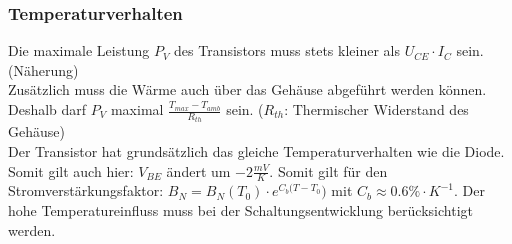 \newpage		
	\subsubsection{Temperaturverhalten}
		Die maximale Leistung $P_V$ des Transistors muss stets kleiner als 
		$U_{CE} \cdot I_C$ sein. (Näherung) \\
		Zusätzlich muss die Wärme auch über das Gehäuse abgeführt werden können. Deshalb
		darf $P_V$ maximal $\frac{T_{max}-T_{amb}}{R_{th}}$ sein. ($R_{th}$: Thermischer
		Widerstand des Gehäuse) \\
		Der Transistor hat grundsätzlich das gleiche Temperaturverhalten wie die Diode. Somit
		gilt auch hier: $V_{BE}$ ändert um $-2\frac{mV}{K}$. Somit gilt für den
		Stromverstärkungsfaktor: $B_N=B_N(T_0)\cdot e^{C_b(T-T_0})$ mit 
		$C_b \approx 0.6\% \cdot K^{-1}$. Der hohe Temperatureinfluss muss bei der
		Schaltungsentwicklung berücksichtigt werden. \\
		
